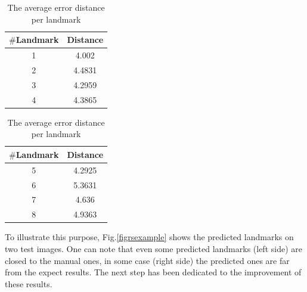 \documentclass[10pt]{article}
\begin{document}
\begin{table}[h!]
	\begin{subtable}{.22\linewidth}
	\centering
	\begin{tabular}{|c|c| }
	\hline
	\textbf{$\#$Landmark} & \textbf{Distance} \\ \hline
	1 & 4.002  \\ \hline
	2 & 4.4831 \\ \hline
	3 & 4.2959 \\ \hline
	4 & 4.3865 \\ \hline
	
	\end{tabular}
	\end{subtable}%
	\hspace{2.5cm}
	\begin{subtable}{.2\linewidth}
	\centering
	\begin{tabular}{|c|c| }
	\hline
	\textbf{$\#$Landmark} & \textbf{Distance} \\ \hline
	5 & 4.2925 \\ \hline
	6 & 5.3631 \\ \hline
	7 & 4.636 \\ \hline
	8 & 4.9363 \\ \hline
	\end{tabular}
	\end{subtable}
	\caption{The average error distance per landmark}
	\label{tabledistance}
\end{table}

To illustrate this purpose, Fig.\ref{figrsexample} shows the predicted landmarks on two test
images. One can note that even some predicted landmarks (left side)
are closed to the manual ones, in some case (right side) the predicted
ones are far from the expect results. The next step has been dedicated
to the improvement of these results.
\end{document}
